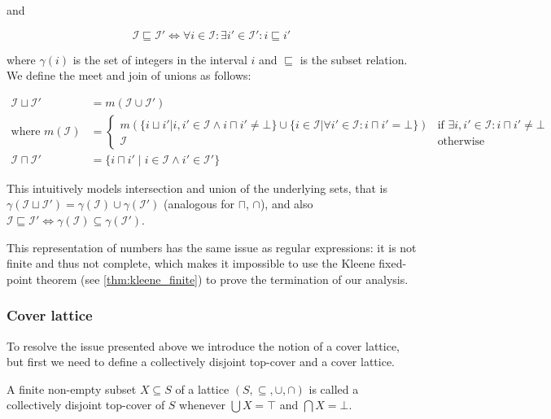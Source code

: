 and


\begin{equation}
    \mathscr{I} \sqsubseteq \mathscr{I}' \iff \forall i \in \mathscr{I} : \exists i' \in \mathscr{I}' : i \sqsubseteq i'
\end{equation}


where $\gamma(i)$ is the set of integers in the interval $i$ and $\sqsubseteq$ is the subset relation.
We define the meet and join of unions as follows:

\begin{align}
    \mathscr{I} \sqcup \mathscr{I}' &= m(\mathscr{I} \cup \mathscr{I}') \\
    \text{where } m(\mathscr{I}) &= \begin{cases}
        m(\{ i \sqcup i' | i, i' \in \mathscr{I} \land i \sqcap i' \neq \bot \} \cup \{ i \in \mathscr{I} | \forall i' \in \mathscr{I} : i \sqcap i' = \bot \}) & \text{if } \exists i, i' \in \mathscr{I}: i \sqcap i' \neq \bot \\
        \mathscr{I} & \text{otherwise}
    \end{cases} \\
    \mathscr{I} \sqcap \mathscr{I}' &= \{i \sqcap i' \mid i \in \mathscr{I} \land i' \in \mathscr{I}'\}
\end{align}

This intuitively models intersection and union of the underlying sets, that is $\gamma(\mathscr{I} \sqcup \mathscr{I}') = \gamma(\mathscr{I}) \cup \gamma(\mathscr{I}')$ (analogous for $\sqcap$, $\cap$), and also $\mathscr{I} \sqsubseteq \mathscr{I}' \iff \gamma(\mathscr{I}) \subseteq \gamma(\mathscr{I}')$.

This representation of numbers has the same issue as regular expressions: it is not finite and thus not complete, which makes it impossible to use the Kleene fixed-point theorem (see \autoref{thm:kleene_finite}) to prove the termination of our analysis.
\subsubsection{Cover lattice}
To resolve the issue presented above we introduce the notion of a cover lattice, but first we need to define a collectively disjoint top-cover and a cover lattice.

\begin{definition}
    A finite non-empty subset $X \subseteq S$ of a lattice $(S, \subseteq, \cup, \cap)$ is called a collectively disjoint top-cover of $S$ whenever $\bigcup X = \top$ and $\bigcap X = \bot$.
\end{definition}

